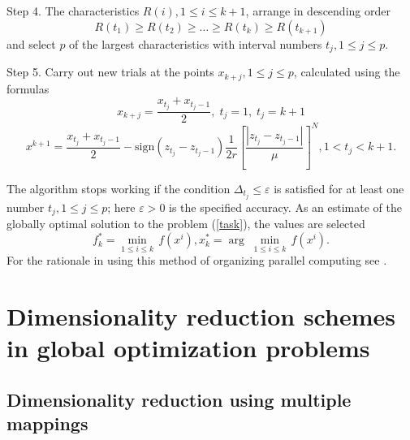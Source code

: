 \documentclass{svproc}
\begin{document}
Step 4. The characteristics \(R(i),1\leqslant i\leqslant k+1\), arrange in descending order 
\begin{displaymath}
\label{step4}
R(t_1)\geqslant R(t_2)\geqslant \dots \geqslant R(t_{k})\geqslant R(t_{k+1})
\end{displaymath}
and select \(p\) of the largest characteristics with interval numbers \(t_j,1\leqslant j\leqslant p\).

Step 5. Carry out new trials at the points \(x_{k+j},1\leqslant j\leqslant p\), calculated using the formulas
\begin{displaymath}
x_{k+j}=\dfrac{x_{t_j}+x_{t_j-1}}{2},\; t_j=1, \; t_j=k+1
\end{displaymath}
\begin{displaymath}
\label{step5}
{{x}^{k+1}}=\frac{{{x}_{{{t}_{j}}}}+{{x}_{{{t}_{j}}-1}}}{2}-\text{sign}({{z}_{{{t}_{j}}}}-{{z}_{{{t}_{j}}-1}})\frac{1}{2r}{{\left[ \frac{|{{z}_{{{t}_{j}}}}-{{z}_{{{t}_{j}}-1}}|}{\mu } \right]}^{N}}, 1<{{t}_{j}}<k+1.
\end{displaymath}

The algorithm stops working if the condition \(\Delta_{t_j}\leqslant \varepsilon\)  is satisfied for at least one number \(t_j,1\leqslant j\leqslant p\); here \(\varepsilon>0\)  is the specified accuracy. As an estimate of the globally optimal solution to the problem (\ref{task}), the values are selected 
\begin{displaymath}
f_{k}^{*}=\underset{1\le i\le k}{\mathop{\min }}\,f({{x}^{i}}),   x_{k}^{*}=\arg \; \underset{1\le i\le k}{\mathop{\min }}\,f({{x}^{i}}).
\end{displaymath}
For the rationale in using this method of organizing parallel computing see \cite{Strongin2000}. 

\section{Dimensionality reduction schemes in global optimization problems}

\subsection{Dimensionality reduction using multiple mappings}
\end{document}
